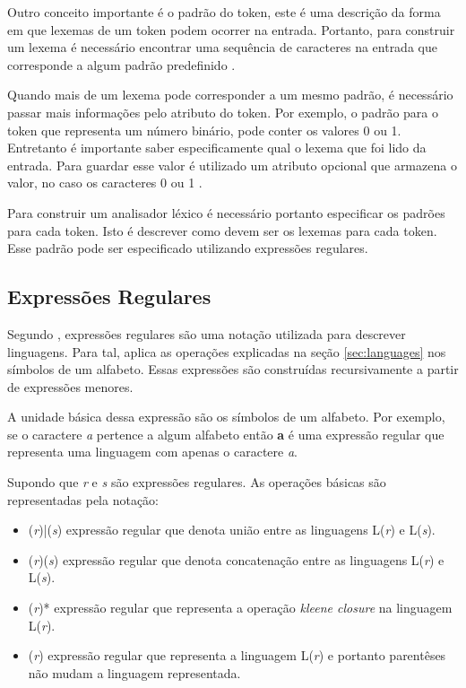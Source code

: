 Outro conceito importante é o padrão do token, este é uma descrição da forma em que lexemas de
um token podem ocorrer na entrada. Portanto, para construir um lexema é necessário 
encontrar uma sequência de caracteres na entrada que corresponde a algum padrão predefinido \cite{aho2006}.

Quando mais de um lexema pode corresponder a um mesmo padrão, é necessário passar mais informações 
pelo atributo do token. Por exemplo, o padrão para o token que representa um número binário, pode conter
os valores 0 ou 1. Entretanto é importante saber especificamente qual o lexema que foi lido da entrada. 
Para guardar esse valor é utilizado um atributo opcional que armazena o valor, no caso os caracteres 
0 ou 1 \cite{aho2006}.

Para construir um analisador léxico é necessário portanto especificar os padrões para cada token. 
Isto é descrever como devem ser os lexemas para cada token. Esse padrão pode ser especificado 
utilizando expressões regulares.

\subsection{Expressões Regulares}

Segundo , expressões regulares são uma notação utilizada para descrever linguagens.
Para tal, aplica as operações explicadas na seção \ref{sec:languages} nos símbolos de um alfabeto.
Essas expressões são construídas recursivamente a partir de expressões menores. 

A unidade básica dessa expressão são os símbolos de um alfabeto. Por exemplo,
se o caractere \textit{a} pertence a algum alfabeto então \textbf{a} é 
uma expressão regular que representa uma linguagem com apenas o caractere \textit{a}.

Supondo que \textit{r} e \textit{s} são expressões regulares. As operações básicas 
são representadas pela notação:

\begin{itemize}
    \item (\textit{r})|(\textit{s}) expressão regular que denota união entre as linguagens L(\textit{r}) e 
    L(\textit{s}).
    \item (\textit{r})(\textit{s}) expressão regular que denota concatenação entre as linguagens L(\textit{r}) e 
    L(\textit{s}).
    \item (\textit{r})* expressão regular que representa a operação \textit{kleene closure} na linguagem L(\textit{r}).
    \item (\textit{r}) expressão regular que representa a linguagem L(\textit{r}) e portanto parentêses não mudam
    a linguagem representada.   
\end{itemize}


